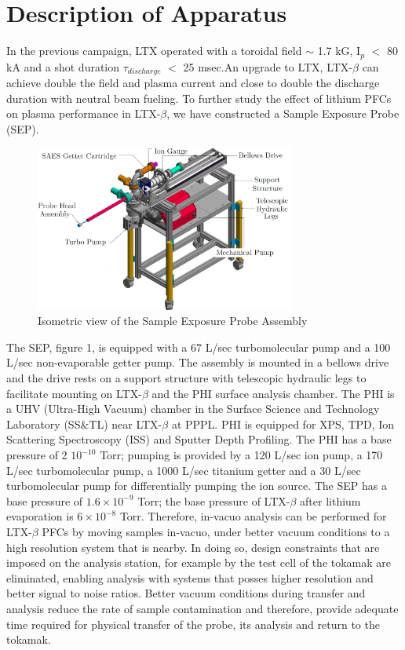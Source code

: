 \documentclass[aip,rsi,amsmath,amssymb,reprint]{revtex4-1}
\begin{document}
\section{Description of Apparatus}

In the previous campaign, LTX operated with a toroidal field $\sim$ 1.7 kG, I$_p$ $<$ 80 kA and a shot duration $\tau_{discharge}$ $<$ 25 msec.An upgrade to LTX, LTX-$\beta$ can achieve double the field and plasma current and close to double the discharge duration with neutral beam fueling. To further study the effect of lithium PFCs on plasma performance in LTX-$\beta$, we have constructed a Sample Exposure Probe (SEP).

\begin{figure}%
\centering
\includegraphics[width=3.37in,keepaspectratio]{SEP_Annotated}%
\caption{Isometric view of the Sample Exposure Probe Assembly}
\end{figure}

The SEP, figure 1, is equipped with a 67 L/sec turbomolecular pump and a 100 L/sec non-evaporable getter pump. The assembly is mounted in a bellows drive and the drive rests on a support structure with telescopic hydraulic legs to facilitate mounting on LTX-$\beta$ and the PHI surface analysis chamber. The PHI is a UHV (Ultra-High Vacuum) chamber in the Surface Science and Technology Laboratory (SS\&TL) near LTX-$\beta$ at PPPL. PHI is equipped for XPS, TPD, Ion Scattering Spectroscopy (ISS) and Sputter Depth Profiling. The PHI has a base pressure of 2 \times $10^{-10}$ Torr; pumping is provided by a 120 L/sec ion pump, a 170 L/sec turbomolecular pump, a 1000 L/sec titanium getter and a 30 L/sec turbomolecular pump for differentially pumping the ion source. The SEP has a base pressure of $1.6 \times 10^{-9}$ Torr; the base pressure of LTX-$\beta$ after lithium evaporation is $6 \times 10^{-8}$ Torr. Therefore, in-vacuo analysis can be performed for LTX-$\beta$ PFCs by moving samples in-vacuo, under better vacuum conditions to a high resolution system that is nearby. In doing so, design constraints that are imposed on the analysis station, for example by the test cell of the tokamak are eliminated, enabling analysis with systems that posses higher resolution and better signal to noise ratios. Better vacuum conditions during transfer and analysis reduce the rate of sample contamination and therefore, provide adequate time required for physical transfer of the probe, its analysis and return to the tokamak. 
\end{document}
